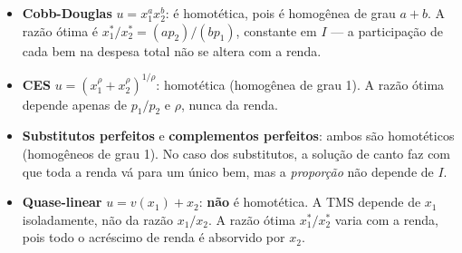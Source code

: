 \documentclass[11pt,twoside,openright]{book}
\providecommand{\tightlist}{\setlength{\itemsep}{0pt}\setlength{\parskip}{0pt}}
\begin{document}
\begin{itemize}
\tightlist
\item
  \textbf{Cobb-Douglas} \(u = x_1^a x_2^b\): é homotética, pois é
  homogênea de grau \(a+b\). A razão ótima é
  \(x_1^*/x_2^* = (a p_2)/(b p_1)\), constante em \(I\) --- a
  participação de cada bem na despesa total não se altera com a renda.
\item
  \textbf{CES} \(u = (x_1^\rho + x_2^\rho)^{1/\rho}\): homotética
  (homogênea de grau 1). A razão ótima depende apenas de \(p_1/p_2\) e
  \(\rho\), nunca da renda.
\item
  \textbf{Substitutos perfeitos} e \textbf{complementos perfeitos}:
  ambos são homotéticos (homogêneos de grau 1). No caso dos substitutos,
  a solução de canto faz com que toda a renda vá para um único bem, mas
  a \emph{proporção} não depende de \(I\).
\item
  \textbf{Quase-linear} \(u = v(x_1) + x_2\): \textbf{não} é homotética.
  A TMS depende de \(x_1\) isoladamente, não da razão \(x_1/x_2\). A
  razão ótima \(x_1^*/x_2^*\) varia com a renda, pois todo o acréscimo
  de renda é absorvido por \(x_2\).
\end{itemize}
\end{document}
